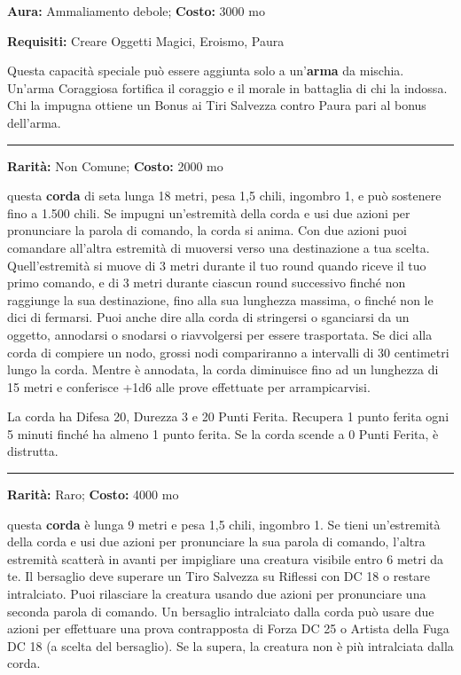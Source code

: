 \begin{multicols}{2}
\textbf{Aura:} Ammaliamento debole; \textbf{Costo:} 3000 mo

\textbf{Requisiti:} Creare Oggetti Magici, Eroismo, Paura

Questa capacità speciale può essere aggiunta solo a un'\textbf{arma} da mischia. Un'arma Coraggiosa fortifica il coraggio e il morale in battaglia di chi la indossa. Chi la impugna ottiene un Bonus ai Tiri Salvezza contro Paura pari al bonus dell'arma.

\smallskip\noindent\rule{\linewidth}{2pt}  \hypertarget{CordadaArrampicata}{}\medskip{}\noindent\label{CordadaArrampicata}

\textbf{Rarità:} Non Comune; \textbf{Costo:} 2000 mo

questa \textbf{corda} di seta lunga 18 metri, pesa 1,5 chili, ingombro 1, e può sostenere fino a 1.500 chili. Se impugni un'estremità della corda e usi due azioni per pronunciare la parola di comando, la corda si anima. Con due azioni puoi comandare all'altra estremità di muoversi verso una destinazione a tua scelta. Quell'estremità si muove di 3 metri durante il tuo round quando riceve il tuo primo comando, e di 3 metri durante ciascun round successivo finché non raggiunge la sua destinazione, fino alla sua lunghezza massima, o finché non le dici di fermarsi. Puoi anche dire alla corda di stringersi o sganciarsi da un oggetto, annodarsi o snodarsi o riavvolgersi per essere trasportata. Se dici alla corda di compiere un nodo, grossi nodi compariranno a intervalli di 30 centimetri lungo la corda. Mentre è annodata, la corda diminuisce fino ad un lunghezza di 15 metri e conferisce +1d6 alle prove effettuate per arrampicarvisi.

La corda ha Difesa 20, Durezza 3 e 20 Punti Ferita. Recupera 1 punto ferita ogni 5 minuti finché ha almeno 1 punto ferita. Se la corda scende a 0 Punti Ferita, è distrutta.

\smallskip\noindent\rule{\linewidth}{2pt}  \hypertarget{Cordadell'Intralciamento}{}\medskip{}\noindent\label{Cordadell'Intralciamento}

\textbf{Rarità:} Raro; \textbf{Costo:} 4000 mo

questa \textbf{corda} è lunga 9 metri e pesa 1,5 chili, ingombro 1. Se tieni un'estremità della corda e usi due azioni per pronunciare la sua parola di comando, l'altra estremità scatterà in avanti per impigliare una creatura visibile entro 6 metri da te. Il bersaglio deve superare un Tiro Salvezza su Riflessi con DC 18 o restare intralciato. Puoi rilasciare la creatura usando due azioni per pronunciare una seconda parola di comando. Un bersaglio intralciato dalla corda può usare due azioni per effettuare una prova contrapposta di Forza DC 25 o Artista della Fuga DC 18 (a scelta del bersaglio). Se la supera, la creatura non è più intralciata dalla corda.


\end{multicols}
